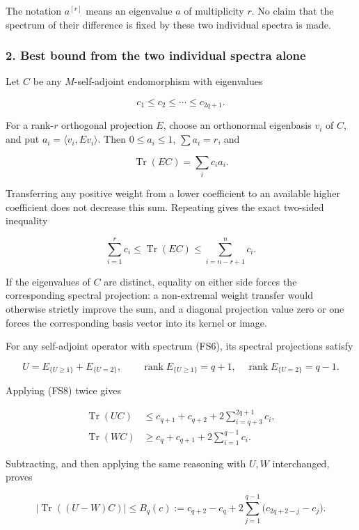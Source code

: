 \documentclass{article}
\begin{document}
The notation \(a^{[r]}\) means an eigenvalue \(a\) of multiplicity \(r\). No claim that the spectrum of their difference is fixed by these two individual spectra is made.

\subsubsection{2. Best bound from the two individual spectra alone}\label{endpoint-four_window_sharpness--best-bound-from-the-two-individual-spectra-alone}

Let \(C\) be any \(M\)-self-adjoint endomorphism with eigenvalues

\[
c_1\le c_2\le\cdots\le c_{2q+1}.
\tag{FS7}
\]

For a rank-\(r\) orthogonal projection \(E\), choose an orthonormal eigenbasis \(v_i\) of \(C\), and put \(a_i=\langle v_i,Ev_i\rangle\). Then \(0\le a_i\le1\), \(\sum a_i=r\), and

\[
\operatorname{Tr}(EC)=\sum_i c_i a_i.
\]

Transferring any positive weight from a lower coefficient to an available higher coefficient does not decrease this sum. Repeating gives the exact two-sided inequality

\[
\sum_{i=1}^r c_i\le\operatorname{Tr}(EC)
\le\sum_{i=n-r+1}^n c_i.
\tag{FS8}
\]

If the eigenvalues of \(C\) are distinct, equality on either side forces the corresponding spectral projection: a non-extremal weight transfer would otherwise strictly improve the sum, and a diagonal projection value zero or one forces the corresponding basis vector into its kernel or image.

For any self-adjoint operator with spectrum (FS6), its spectral projections satisfy

\[
U=E_{\{U\ge1\}}+E_{\{U=2\}},
\qquad \operatorname{rank}E_{\{U\ge1\}}=q+1,
\quad\operatorname{rank}E_{\{U=2\}}=q-1.
\tag{FS9}
\]

Applying (FS8) twice gives

\[
\begin{aligned}
\operatorname{Tr}(UC)
&\le c_{q+1}+c_{q+2}+2\sum_{i=q+3}^{2q+1}c_i,\\
\operatorname{Tr}(WC)
&\ge c_q+c_{q+1}+2\sum_{i=1}^{q-1}c_i.
\end{aligned}
\tag{FS10}
\]

Subtracting, and then applying the same reasoning with \(U,W\) interchanged, proves

\[
\boxed{
\left|\operatorname{Tr}((U-W)C)\right|
\le B_q(c):=
c_{q+2}-c_q+
2\sum_{j=1}^{q-1}\bigl(c_{2q+2-j}-c_j\bigr).
}
\tag{FS11}
\]
\end{document}
